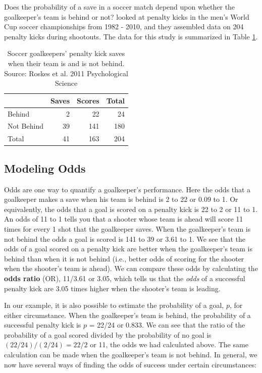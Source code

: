 \documentclass[
]{krantz}
\begin{document}
Does the probability of a save in a soccer match depend upon whether the goalkeeper's team is behind or not? \citet{Roskes2011} looked at penalty kicks in the men's World Cup soccer championships from 1982 - 2010, and they assembled data on 204 penalty kicks during shootouts. The data for this study is summarized in Table \ref{tab:table1chp6}.

\begin{table}

\caption{\label{tab:table1chp6}Soccer goalkeepers' penalty kick saves when their team is and is not behind.  Source: Roskes et al. 2011 Psychological Science}
\centering
\begin{tabular}[t]{lrrr}
\toprule
  & Saves & Scores & Total\\
\midrule
Behind & 2 & 22 & 24\\
Not Behind & 39 & 141 & 180\\
Total & 41 & 163 & 204\\
\bottomrule
\end{tabular}
\end{table}

\hypertarget{modeling-odds}{%
\subsection{Modeling Odds}\label{modeling-odds}}

Odds are one way to quantify a goalkeeper's performance. Here the odds that a goalkeeper makes a save when his team is behind is 2 to 22 or 0.09 to 1. Or equivalently, the odds that a goal is scored on a penalty kick is 22 to 2 or 11 to 1. An odds of 11 to 1 tells you that a shooter whose team is ahead will score 11 times for every 1 shot that the goalkeeper saves. When the goalkeeper's team is not behind the odds a goal is scored is 141 to 39 or 3.61 to 1. We see that the odds of a goal scored on a penalty kick are better when the goalkeeper's team is behind than when it is not behind (i.e., better odds of scoring for the shooter when the shooter's team is ahead). We can compare these odds by calculating the \textbf{odds ratio}  (OR), 11/3.61 or 3.05, which tells us that the \emph{odds} of a successful penalty kick are 3.05 times higher when the shooter's team is leading.

In our example, it is also possible to estimate the probability of a goal, \(p\), for either circumstance. When the goalkeeper's team is behind, the probability of a successful penalty kick is \(p\) = 22/24 or 0.833. We can see that the ratio of the probability of a goal scored divided by the probability of no goal is \((22/24)/(2/24)=22/2\) or 11, the odds we had calculated above. The same calculation can be made when the goalkeeper's team is not behind. In general, we now have several ways of finding the odds of success under certain circumstances:
\end{document}
